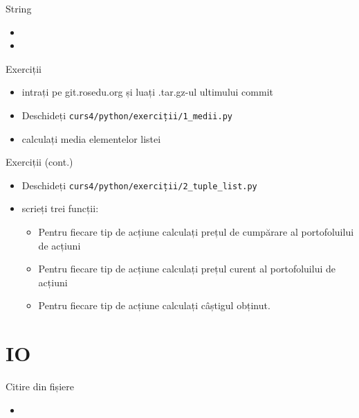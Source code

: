 \documentclass{beamer}
\begin{document}
\begin{frame}{String}
  \begin{itemize}
  \item 
  \item 
  \end{itemize}
\end{frame}

\begin{frame}{Exerciții}
  \begin{itemize}
  \item intrați pe git.rosedu.org și luați .tar.gz-ul ultimului commit
  \item Deschideți \texttt{curs4/python/exerciții/1\_medii.py}
  \item calculați media elementelor listei
  \end{itemize}
\end{frame}

\begin{frame}{Exerciții (cont.)}
  \begin{itemize}
  \item Deschideți \texttt{curs4/python/exerciții/2\_tuple\_list.py}
  \item scrieți trei funcții:
    \begin {itemize}
    \item Pentru fiecare tip de acțiune calculați prețul de cumpărare al portofoluilui de acțiuni
    \item Pentru fiecare tip de acțiune calculați prețul curent al portofoluilui de acțiuni
    \item Pentru fiecare tip de acțiune calculați câștigul obținut.
    \end{itemize}
  \end{itemize}
\end{frame}



\section{IO}
\frame{\tableofcontents[currentsection]}

\begin{frame}{Citire din fișiere}
  \begin{itemize}
  \item \small 
  \end{itemize}
\end{frame}
\end{document}
